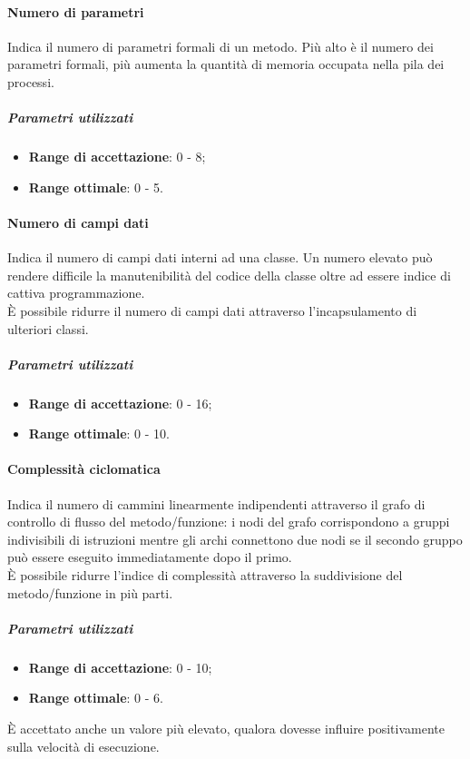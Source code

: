 \documentclass[../PianoDiQualifica.tex]{subfiles}
\begin{document}
				\paragraph{Numero di parametri\\}
					Indica il numero di parametri formali di un metodo. Più alto è il
					numero dei parametri formali, più aumenta la quantità di memoria
					occupata nella pila dei processi.
					\subparagraph{Parametri utilizzati}
						\begin{itemize}
							\item \textbf{Range di accettazione}: 0 - 8;
							\item \textbf{Range ottimale}: 0 - 5.
						\end{itemize}
				\paragraph{Numero di campi dati\\}
					Indica il numero di campi dati interni ad una classe. Un numero
					elevato può rendere difficile la manutenibilità del codice della
					classe oltre ad essere indice di cattiva programmazione.\\
					È possibile ridurre il numero di campi dati attraverso
					l'incapsulamento di ulteriori classi.
					\subparagraph{Parametri utilizzati}
						\begin{itemize}
							\item \textbf{Range di accettazione}: 0 - 16;
							\item \textbf{Range ottimale}: 0 - 10.
						\end{itemize}
				\paragraph{Complessità ciclomatica\\}
					Indica il numero di cammini linearmente indipendenti attraverso il
					grafo di controllo di flusso del metodo/funzione: i nodi del grafo
					corrispondono a gruppi indivisibili di istruzioni mentre gli archi
					connettono due nodi se il secondo gruppo può essere eseguito
					immediatamente dopo il primo.\\
					È possibile ridurre l'indice di complessità attraverso la
					suddivisione del metodo/funzione in più parti.
					\subparagraph{Parametri utilizzati}
						\begin{itemize}
							\item \textbf{Range di accettazione}: 0 - 10;
							\item \textbf{Range ottimale}: 0 - 6.
						\end{itemize}
						\par È accettato anche un valore più elevato, qualora
						dovesse influire positivamente sulla velocità di esecuzione.
\end{document}
